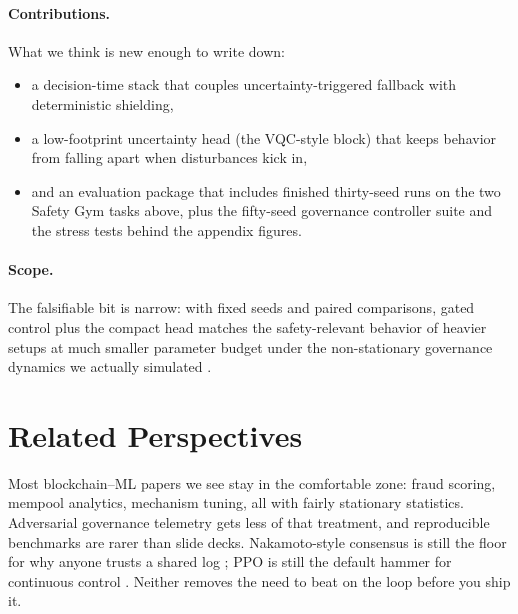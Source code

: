 \paragraph{Contributions.}
What we think is new enough to write down:
\begin{itemize}
    \item a decision-time stack that couples uncertainty-triggered fallback with deterministic shielding,
    \item a low-footprint uncertainty head (the VQC-style block) that keeps behavior from falling apart when disturbances kick in,
    \item and an evaluation package that includes finished thirty-seed runs on the two Safety Gym tasks above, plus the fifty-seed governance controller suite and the stress tests behind the appendix figures.
\end{itemize}

\begin{table}[htbp]
\centering

\caption{Core contribution layering: what is algorithmically novel versus efficiency support versus deployment engineering.}
\label{tab:core-contribution-layers}
\end{table}

\paragraph{Scope.}
The falsifiable bit is narrow: with fixed seeds and paired comparisons, gated control plus the compact head matches the safety-relevant behavior of heavier setups at much smaller parameter budget under the non-stationary governance dynamics we actually simulated \cite{dror2018hitchhikers,pineau2021improving,wilson2017good}.

\section{Related Perspectives}

Most blockchain--ML papers we see stay in the comfortable zone: fraud scoring, mempool analytics, mechanism tuning, all with fairly stationary statistics. Adversarial governance telemetry gets less of that treatment, and reproducible benchmarks are rarer than slide decks. Nakamoto-style consensus is still the floor for why anyone trusts a shared log \cite{nakamoto2008bitcoin}; PPO is still the default hammer for continuous control \cite{schulman2017ppo}. Neither removes the need to beat on the loop before you ship it.

